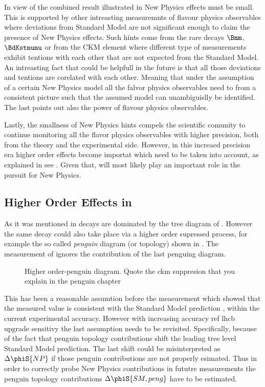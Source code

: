 In view of the combined \phis result illustrated in  New Physics effects must be small.
This is supported by other intreasting measuremnts of flavour physics observables where deviations from Standard Model are not significant enough
to claim the presence of New Physics effects. Such hints come from the rare decays $\Bmm$, $\BdKstmumu$ or from the \Vub CKM element
where different type of measurements exhibit tentions with each other that are not expected from the Standard Model.
An intreasting fact that could be helpfull in the future is that all those deviations and tentions are
corelated with each other. Meaning that under the assumption of a certain New Physics model all the falvor physics
observables need to from a consistent picture such that the assumed model can unambiguislly be identified.
The last points out also the power of flavour physics observables.

Lastly, the smallness of New Physics hints compels the scientific comunity to continue monitoring all the
flavor physics observables with higher precision, both from the theory and the experimental side.
However, in this increaed precision era higher order effects become importat which need to be taken into account,
as explained in see . Given that, \phis will most likely play an important role in the
pursuit for New Physics.

\subsection{Higher Order Effects in \phis}
\label{TheBsJpsiKstDecay}
As it was mentioned in  \BsJpsiPhi decays are dominated by the tree diagram of .
However the same decay could also take place via a higher order supressed process, for example the so called {\it penguin} diagram (or topology)
shown in . The \phis measurement of  ignores the contribution of the last penguing diagram.

\begin{figure}[h]
  \centering
  {\sffamily }
  \caption{ Higher order-penguin diagram. {\color{red} Quote the ckm suppresion that you explain in the penguin chapter}}
  \label{bs2jpsiphi_peng}
\end{figure}

\noindent This has been a reasonable assumtion before the \lhcb measurement which showed that the measured  value is consistent with the Standard
Model prediction , within the current experimental accuracy. However with increasing accuracy {\color{red} ref lhcb upgrade \phis sensitivy}
the last assumption needs to be revisited.
Specifically, because of the fact that penguin topology contributions shift the leading tree level Standard Model prediction.
The last shift could be misinterpreted as $\Delta\phiS{NP}$ if those penguin contributions are not properly esimated.
Thus in order to correctly probe New Physics contributions in fututre measurements the penguin topology contributions $\Delta\phiS{SM,peng}$
have to be estimated.

